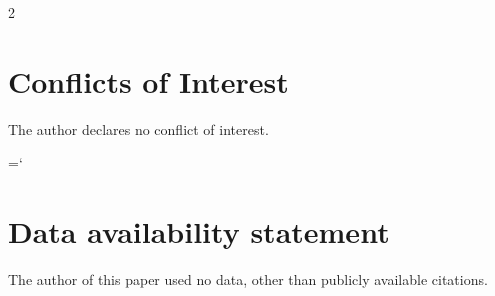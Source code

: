 \documentclass[12pt,oneside]{academia}
\theoremstyle{remark}
\begin{document}
\begin{multicols}{2}
\section{Conflicts of Interest}
The author declares no conflict of interest.

\mathchardef\mystar=\mathcode`\*
\section{Data availability statement}
The author of this paper used no data, other than publicly available citations.

\end{multicols}
\end{document}
